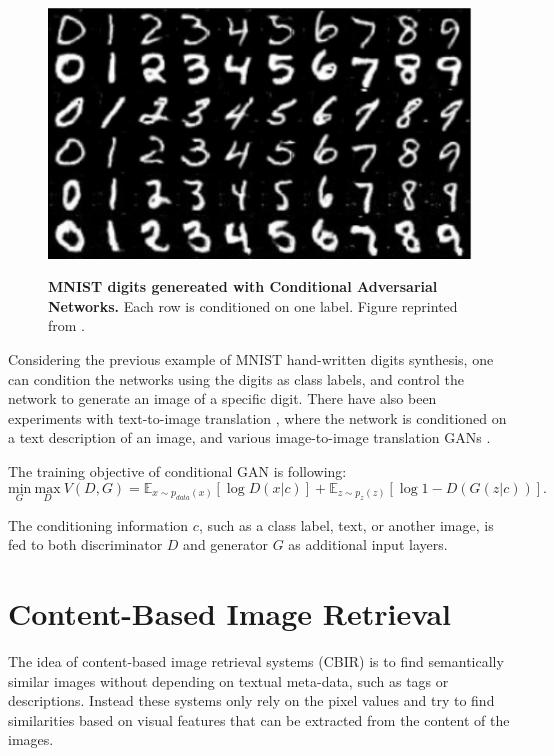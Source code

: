 \documentclass[12pt]{report}
\begin{document}
\begin{figure}[t]
\centering
{\includegraphics[width=.6\linewidth]{02_background/mnist_cgan2}}
\caption{\label{fig:cgan} \textbf{MNIST digits genereated with Conditional Adversarial Networks.} Each row is conditioned on one label. Figure reprinted from \cite{mirza_conditional_2014}.}
\end{figure}

Considering the previous example of MNIST hand-written digits synthesis, one can condition the networks using the digits as class labels, and control the network to generate an image of a specific digit. There have also been experiments with text-to-image translation \cite{reed_generative_2016}, where the network is conditioned on a text description of an image, and various image-to-image translation GANs \cite{yoo_pixel-level_2016}\cite{yoo_pixel-level_2016}\cite{pathak_context_2016}.

The training objective of conditional GAN is following:
\begin{equation}
\underset{G}{\mathrm{min}} \ \underset{D}{\mathrm{max}} \ V(D,G) = \mathbb{E}_{x \sim p_{data}(x)}[\log D(x|c)] + \mathbb{E}_{z \sim p_{z}(z)}[\log 1 - D(G(z|c))].
\label{eq:cgan}
\end{equation}

The conditioning information $c$, such as a class label, text, or another image, is fed to both discriminator $D$ and generator $G$ as additional input layers.


\section{Content-Based Image Retrieval}
The idea of content-based image retrieval systems (CBIR) is to find semantically similar images without depending on textual meta-data, such as tags or descriptions. Instead these systems only rely on the pixel values and try to find similarities based on visual features that can be extracted from the content of the images.
\end{document}
